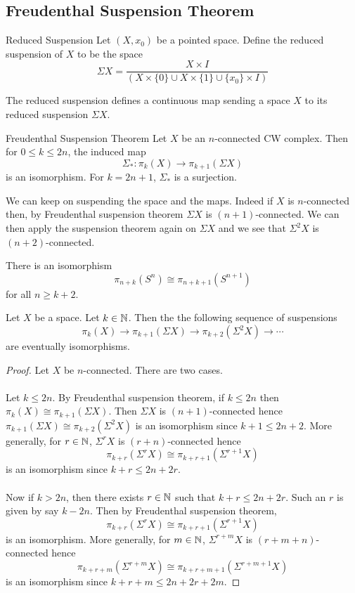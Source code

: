 \documentclass[a4paper]{article}
\begin{document}
\subsection{Freudenthal Suspension Theorem}
\begin{defn}{Reduced Suspension}{} Let $(X,x_0)$ be a pointed space. Define the reduced suspension of $X$ to be the space $$\Sigma X=\frac{X\times I}{(X\times\{0\}\cup X\times\{1\}\cup\{x_0\}\times I)}$$
\end{defn}

The reduced suspension defines a continuous map sending a space $X$ to its reduced suspension $\Sigma X$. 

\begin{thm}{Freudenthal Suspension Theorem}{} Let $X$ be an $n$-connected CW complex. Then for $0\leq k\leq 2n$, the induced map $$\Sigma_\ast:\pi_k(X)\to\pi_{k+1}(\Sigma X)$$ is an isomorphism. For $k=2n+1$, $\Sigma_\ast$ is a surjection. 
\end{thm}

We can keep on suspending the space and the maps. Indeed if $X$ is $n$-connected then, by Freudenthal suspension theorem $\Sigma X$ is $(n+1)$-connected. We can then apply the suspension theorem again on $\Sigma X$ and we see that $\Sigma^2X$ is $(n+2)$-connected. 

\begin{crl}{}{} There is an isomorphism $$\pi_{n+k}(S^n)\cong\pi_{n+k+1}(S^{n+1})$$ for all $n\geq k+2$. 
\end{crl}

\begin{prp}{}{} Let $X$ be a space. Let $k\in\mathbb{N}$. Then the the following sequence of suspensions $$\pi_k(X)\to\pi_{k+1}(\Sigma X)\to\pi_{k+2}(\Sigma^2X)\to\cdots$$ are eventually isomorphisms. \tcbline
\begin{proof}
Let $X$ be $n$-connected. There are two cases. \\~\\

Let $k\leq 2n$. By Freudenthal suspension theorem, if $k\leq 2n$ then $\pi_k(X)\cong\pi_{k+1}(\Sigma X)$. Then $\Sigma X$ is $(n+1)$-connected hence $\pi_{k+1}(\Sigma X)\cong\pi_{k+2}(\Sigma^2X)$ is an isomorphism since $k+1\leq 2n+2$. More generally, for $r\in\mathbb{N}$, $\Sigma^rX$ is $(r+n)$-connected hence $$\pi_{k+r}(\Sigma^rX)\cong\pi_{k+r+1}(\Sigma^{r+1}X)$$ is an isomorphism since $k+r\leq 2n+2r$. \\~\\

Now if $k>2n$, then there exists $r\in\mathbb{N}$ such that $k+r\leq 2n+2r$. Such an $r$ is given by say $k-2n$. Then by Freudenthal suspension theorem, $$\pi_{k+r}(\Sigma^rX)\cong\pi_{k+r+1}(\Sigma^{r+1}X)$$ is an isomorphism. More generally, for $m\in\mathbb{N}$, $\Sigma^{r+m}X$ is $(r+m+n)$-connected hence $$\pi_{k+r+m}(\Sigma^{r+m}X)\cong\pi_{k+r+m+1}(\Sigma^{r+m+1}X)$$ is an isomorphism since $k+r+m\leq 2n+2r+2m$. 
\end{proof}
\end{prp}
\end{document}
